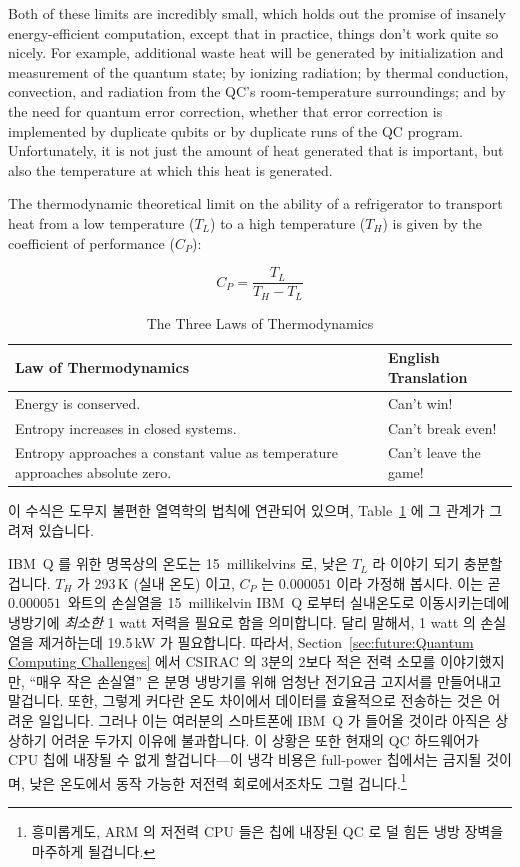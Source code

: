 Both of these limits are incredibly small, which holds out the promise
of insanely energy-efficient computation, except that
in practice, things don't work quite so nicely.
For example, additional waste heat will be generated
by initialization and measurement of the quantum state;
by ionizing radiation;
by thermal conduction, convection, and radiation from
the QC's room-temperature surroundings;
and
by the need for quantum error correction, whether that error correction
is implemented by duplicate qubits or by duplicate runs of the QC
program.
Unfortunately, it is not just the amount of heat generated that is
important, but also the temperature at which this heat is generated.

The thermodynamic theoretical limit on the ability of a refrigerator
to transport heat from a low temperature ($T_L$) to a high temperature
($T_H$) is given by the coefficient of performance ($C_P$):
\fi

\begin{equation}
	C_P = \frac{T_L}{T_H - T_L}
\end{equation}

\begin{table}
\centering\footnotesize
\begin{tabular}{p{1.7in}|p{0.95in}}
Law of Thermodynamics
	& English Translation \\
\hline
\hline
Energy is conserved.
	& Can't win! \\
\hline
Entropy increases in closed systems.
	& Can't break even! \\
\hline
Entropy approaches a constant value as temperature approaches absolute zero.
	& Can't leave the game! \\
\end{tabular}
\caption{The Three Laws of Thermodynamics}
\label{tab:future:The Three Laws of Thermodynamics}
\end{table}

이 수식은 도무지 불편한 열역학의 법칙에 연관되어 있으며,
Table~\ref{tab:future:The Three Laws of Thermodynamics} 에 그 관계가 그려져
있습니다.

IBM~Q 를 위한 명목상의 온도는 15~millikelvins 로, 낮은 $T_L$ 라 이야기 되기
충분할 겁니다.
$T_H$ 가 293\,K (실내 온도) 이고, $C_P$ 는 $0.000051$ 이라 가정해 봅시다.
이는 곧 $0.000051$~와트의 손실열을 15~millikelvin IBM~Q 로부터 실내온도로
이동시키는데에 냉방기에 \emph{최소한} 1 watt 저력을 필요로 함을 의미합니다.
달리 말해서, 1 watt 의 손실열을 제거하는데 19.5\,kW 가 필요합니다.
따라서,
Section~\ref{sec:future:Quantum Computing Challenges} 에서 CSIRAC 의 3분의
2보다 적은 전력 소모를 이야기했지만, ``매우 작은 손실열'' 은 분명 냉방기를 위해
엄청난 전기요금 고지서를 만들어내고 말겁니다.
또한, 그렇게 커다란 온도 차이에서 데이터를 효율적으로 전송하는 것은 어려운
일입니다.
그러나 이는 여러분의 스마트폰에 IBM~Q 가 들어올 것이라 아직은 상상하기 어려운
두가지 이유에 불과합니다.
이 상황은 또한 현재의 QC 하드웨어가 CPU 칩에 내장될 수 없게 할겁니다---이 냉각
비용은 full-power 칩에서는 금지될 것이며, 낮은 온도에서 동작 가능한 저전력
회로에서조차도 그럴 겁니다.\footnote{
	흥미롭게도, ARM 의 저전력 CPU 들은 칩에 내장된 QC 로 덜 힘든 냉방
	장벽을 마주하게 될겁니다.}
\iffalse


